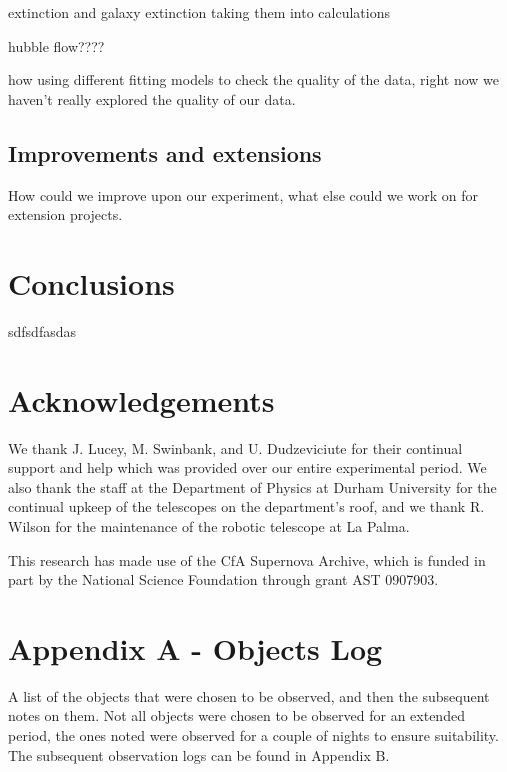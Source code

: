 \documentclass[twocolumn]{revtex4}
\begin{document}
extinction and galaxy extinction taking them into calculations

hubble flow????

how using different fitting models to check the quality of the data, right now we haven't really explored the quality of our data. 

\subsection{Improvements and extensions}
How could we improve upon our experiment, what else could we work on for extension projects.

\vspace{-5ex}
\section{Conclusions}
\label{conclusions}
\vspace{-2ex}

sdfsdfasdas

\vspace{-5ex}
\section*{Acknowledgements}
\vspace{-2ex}
We thank J. Lucey, M. Swinbank, and U. Dudzeviciute for their continual support and help which was provided over our entire experimental period. We also thank the staff at the Department of Physics at Durham University for the continual upkeep of the telescopes on the department's roof, and we thank R. Wilson for the maintenance of the robotic telescope at La Palma.

This research has made use of the CfA Supernova Archive, which is funded in part by the National Science Foundation through grant AST 0907903.




\clearpage
\onecolumngrid
\vspace{-3ex}
\section*{Appendix A - Objects Log} \label{objectslog}
\vspace{-2ex}
A list of the objects that were chosen to be observed, and then the subsequent notes on them. Not all objects were chosen to be observed for an extended period, the ones noted were observed for a couple of nights to ensure suitability. The subsequent observation logs can be found in Appendix B.
\end{document}
